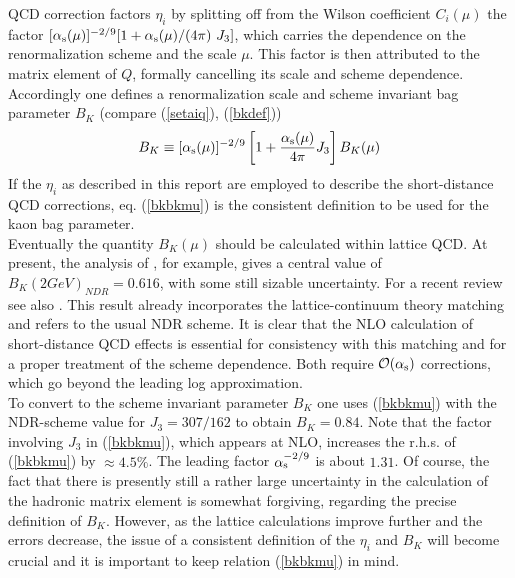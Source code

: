 QCD correction factors $\eta_i$ by splitting off from the
Wilson coefficient $C_i(\mu)$ the factor
$[\alpha_{\rm s}(\mu)]^{-2/9}[1+\alpha_{\rm s}(\mu)/(4\pi)\ J_3]$, which
carries the dependence on the renormalization scheme and the scale $\mu$.
This factor is then
attributed to the matrix element of $Q$, formally cancelling its
scale and scheme dependence. Accordingly one defines a
renormalization scale and scheme invariant bag parameter $B_K$
(compare (\ref{setaiq}), (\ref{bkdef}))
\begin{equation}\label{bkbkmu}
B_K\equiv [\alpha_{\rm s}(\mu)]^{-2/9}\left[
1+\frac{\alpha_{\rm s}(\mu)}{4\pi}J_3\right] B_K(\mu)
\end{equation}
If the $\eta_i$ as described in this report are employed to
describe the short-distance QCD corrections, eq. (\ref{bkbkmu})
is the consistent definition to be used for the kaon bag
parameter.
\\
Eventually the quantity $B_K(\mu)$ should be calculated within
lattice QCD. At present, the analysis of \cite{sharpe:94}, for
example, gives a central value of $B_K(2 GeV)_{NDR}=0.616$, with
some still sizable uncertainty. For a recent review see also
\cite{soni:95}.
This result already incorporates the lattice-continuum
theory matching and refers to the usual NDR scheme.
It is clear that the NLO calculation of short-distance QCD effects
is essential for consistency with this matching and for a proper
treatment of the scheme dependence. Both require ${\cal O}(\alpha_{\rm s})$
corrections, which go beyond the leading log approximation.
\\
To convert to the scheme invariant parameter $B_K$ one uses
(\ref{bkbkmu}) with the NDR-scheme value for $J_3=307/162$ to
obtain $B_K=0.84$. Note that the factor involving $J_3$ in (\ref{bkbkmu}),
which appears at NLO, increases the r.h.s. of (\ref{bkbkmu}) by
$\approx 4.5\%$. The leading factor $\alpha_{\rm s}^{-2/9}$ is about $1.31$.
Of course, the fact that there is presently still a rather large
uncertainty in the calculation of the hadronic matrix element is
somewhat forgiving, regarding the precise definition of $B_K$.
However, as the lattice calculations improve further and the errors
decrease, the issue of a consistent definition of the $\eta_i$
and $B_K$ will become crucial and it is important to keep
relation (\ref{bkbkmu}) in mind.

